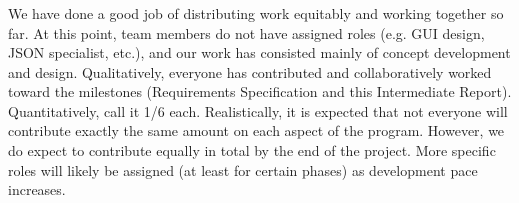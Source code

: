 \documentclass{llncs}
\begin{document}
\subsubsection{}We have done a good job of distributing work equitably and working together so far.  At this point, team members do not have assigned roles (e.g. GUI design, JSON specialist, etc.), and our work has consisted mainly of concept development and design.  Qualitatively, everyone has contributed and collaboratively worked toward the milestones (Requirements Specification and this Intermediate Report).  Quantitatively, call it 1/6 each.  Realistically, it is expected that not everyone will contribute exactly the same amount on each aspect of the program.  However, we do expect to contribute equally in total by the end of the project.  More specific roles will likely be assigned (at least for certain phases) as development pace increases.







%

%
%

\end{document}
